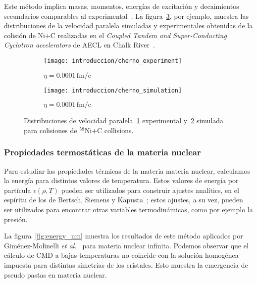 Este método implica masas, momentos, energías de excitación y decaimientos secundarios comparables al experimental~\cite{belkacem_searching_1996,chernomoretz_quasiclassical_2002}.
La figura~\ref{fig:distribution}, por ejemplo, muestra las distribuciones de la velocidad paralela simuladas y experimentales obtenidas de la colisión de $\text{Ni+C}$ realizadas en el \emph{Coupled Tandem and Super-Conducting Cyclotron accelerators} de AECL en Chalk River~\cite{chernomoretz_quasiclassical_2002}.

\begin{figure}[h]
  \begin{subfigure}[h!]{\columnwidth}
    \texttt{[image: introduccion/cherno\_experiment]}
    \caption{$\eta = 0.0001\,\text{fm/c}$}
    \label{sfig:exp}
  \end{subfigure}
  \begin{subfigure}[h!]{\columnwidth}
    \texttt{[image: introduccion/cherno\_simulation]}
    \caption{$\eta = 0.0001\,\text{fm/c}$}
    \label{sfig:sim}
  \end{subfigure}
  \centering
  \caption{Distribuciones de velocidad paralela~\ref{sfig:exp} experimental y~\ref{sfig:sim} simulada para colisiones de ${}^{58}\text{Ni+C}$ collisions.}
  \label{fig:distribution}
\end{figure}


\subsubsection{Propiedades termostáticas de la materia nuclear}
Para estudiar las propiedades térmicas de la materia materia nuclear, calculamos la energía para distintos valores de temperatura.
Estos valores de energía por partícula $\epsilon(\rho,T)$ pueden ser utilizados para construir ajustes analítics, en el espíritu de los de Bertsch, Siemens y Kapusta~\cite{bertsch_nuclear_1983, kapusta_deuteron_1984,
  lopez_nuclear_1984}; estos ajustes, a su vez, pueden ser utilizados para encontrar otras variables termodinámicas, como por ejemplo la presión.

La figura~\ref{fig:energy_nm} muestra los resultados de este método aplicados por Giménez-Molinelli \emph{et al.}~\cite{gimenez_molinelli_simulations_2014} para materia nuclear infinita.
Podemos observar que el cálculo de CMD a bajas temperaturas no coincide con la solución homogénea impuesta para distintas simetrías de los cristales.
Esto muestra la emergencia de pseudo pastas en materia nuclear.

